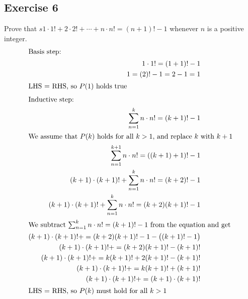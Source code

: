 \documentclass[12pt]{article}
\begin{document}
    \subsection{Exercise 6}
    Prove that $s1 \cdot 1!+2 \cdot 2! + \cdots + n \cdot n! = (n+1)!-1$ whenever $n$ is a positive integer.
    \begin{align}
        \intertext{Basis step:}
        1\cdot 1! = (1 + 1)! - 1 \\
        1 = (2)! - 1 = 2 - 1 = 1\\
        \intertext{LHS = RHS, so $P(1)$ holds true}
        \intertext{Inductive step:}
        \sum_{n = 1}^k{n\cdot n!} = (k + 1)! - 1 \\ %
        \intertext{We assume that $P(k)$ holds for all $k > 1$, and replace
            $k$ with $k+1$}
        \sum_{n = 1}^{k+1}{n\cdot n!} = ((k+1) + 1)! - 1 \\
        (k+1)\cdot(k+1)! + \sum_{n = 1}^{k}{n\cdot n!}  = (k+2)! - 1 \\
        (k+1)\cdot(k+1)! + \sum_{n = 1}^{k}{n\cdot n!}  = (k+2)(k+1)! - 1 \\
        \intertext{We subtract $\sum_{n = 1}^k{n\cdot n!} = (k + 1)! - 1$ from the equation and get}
        (k+1)\cdot(k+1)! +  = (k+2)(k+1)! - 1 - \big( (k+1)! - 1\big)\\
        (k+1)\cdot(k+1)! +  = (k+2)(k+1)!  -  (k+1)! \\
        (k+1)\cdot(k+1)! +  = k(k+1)! + 2(k+1)! - (k+1)! \\
        (k+1)\cdot(k+1)! +  = k(k+1)! + (k+1)!  \\
        (k+1)\cdot(k+1)! +  = (k+1)\cdot(k+1)!  \\
        \intertext{LHS = RHS, so $P(k)$ must hold for all $k > 1$}
    \end{align}
\end{document}
